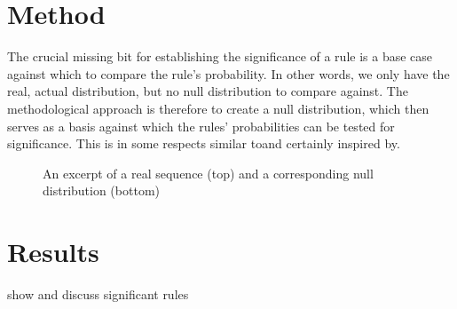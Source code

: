 \section{Method}
\label{sec:significancemethod}
The crucial missing bit for establishing the significance of a rule is a base case against which to compare the rule's probability. In other words, we only have the real, actual distribution, but no null distribution to compare against. The methodological approach is therefore to create a null distribution, which then serves as a basis against which the rules' probabilities can be tested for significance. This is in some respects similar to\dash and certainly inspired by\dash \citet[]{abuzhaya17}.

%

\begin{figure}
	\centering
	
	\caption{An excerpt of a real sequence (top) and a corresponding null distribution (bottom)}
	\label{fig:null}
\end{figure}

%

\section{Results}
\label{sec:significanceresults}
show and discuss significant rules